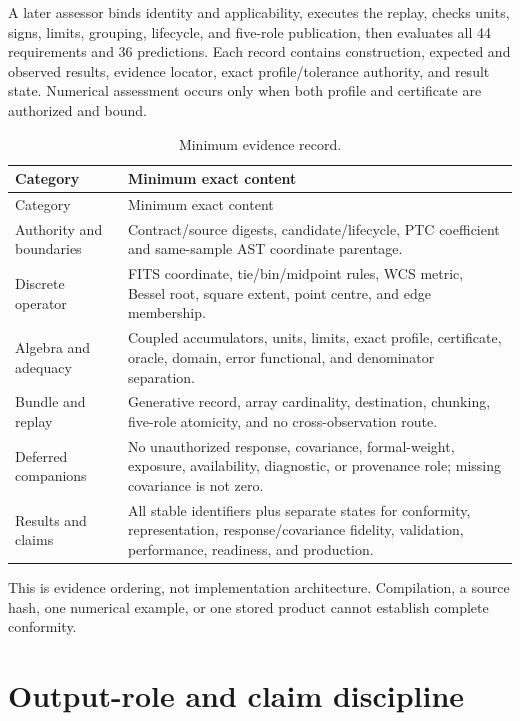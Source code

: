\documentclass[10pt]{article}
\begin{document}
A later assessor binds identity and applicability, executes the replay,
checks units, signs, limits, grouping, lifecycle, and five-role publication,
then evaluates all 44 requirements and 36 predictions.  Each record contains
construction, expected and observed results, evidence locator, exact
profile/tolerance authority, and result state.  Numerical assessment occurs
only when both profile and certificate are authorized and bound.

\begin{longtable}{@{}>{\raggedright\arraybackslash}p{}
                        >{\raggedright\arraybackslash}p{}@{}}
\caption{Minimum evidence record.}\label{tab:eng-evidence}\\
\toprule
Category & Minimum exact content \\
\midrule
\endfirsthead
\toprule
Category & Minimum exact content \\
\midrule
\endhead
Authority and boundaries & Contract/source digests, candidate/lifecycle,
PTC coefficient and same-sample AST coordinate parentage. \\
Discrete operator & FITS coordinate, tie/bin/midpoint rules, WCS metric,
Bessel root, square extent, point centre, and edge membership. \\
Algebra and adequacy & Coupled accumulators, units, limits, exact profile,
certificate, oracle, domain, error functional, and denominator separation. \\
Bundle and replay & Generative record, array cardinality, destination,
chunking, five-role atomicity, and no cross-observation route. \\
Deferred companions & No unauthorized response, covariance, formal-weight,
exposure, availability, diagnostic, or provenance role; missing covariance is
not zero. \\
Results and claims & All stable identifiers plus separate states for
conformity, representation, response/covariance fidelity, validation,
performance, readiness, and production. \\
\bottomrule
\end{longtable}

This is evidence ordering, not implementation architecture.  Compilation, a
source hash, one numerical example, or one stored product cannot establish
complete conformity.

\section{Output-role and claim discipline}
\label{sec:eng-claims}
\end{document}
